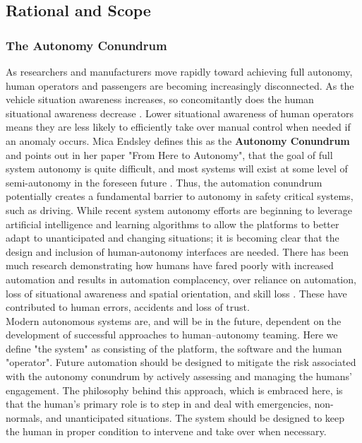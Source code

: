\subsection{Rational and Scope}
\subsubsection{The Autonomy Conundrum}
As researchers and manufacturers move rapidly toward achieving full autonomy, human operators and passengers are becoming increasingly disconnected. As the vehicle situation awareness increases, so concomitantly does the human situational awareness decrease \cite{Flemisch2003}. Lower situational awareness of human operators means they are less likely to efficiently take over manual control when needed if an anomaly occurs. Mica Endsley defines this as the 
\textbf{Autonomy Conundrum} and points out in her paper "From Here to Autonomy", that the goal of full system autonomy is quite difficult, and most systems will exist at some level of semi-autonomy in the foreseen future \cite{Endsley2017}. Thus, the automation conundrum potentially creates a fundamental barrier to autonomy in safety critical systems, such as driving. While recent system autonomy efforts are beginning to leverage artificial intelligence and learning algorithms to allow the platforms to better adapt to unanticipated and changing situations; it is becoming clear that the design and inclusion of human-autonomy interfaces are needed. There has been much research demonstrating how humans have fared poorly with increased automation and results in automation complacency, over reliance on automation, loss of situational awareness and spatial orientation, and skill loss \cite{Schutte2017,Gouraud2018,Parasuraman1993}. These have contributed to human errors, accidents and loss of trust.\\

Modern autonomous systems are, and will be in the future, dependent on the development of successful approaches to human–autonomy teaming. Here we define "the system" as consisting of the platform, the software and the human "operator". Future automation should be designed to mitigate the risk associated with the autonomy conundrum by actively assessing and managing the humans' engagement. The philosophy behind this approach, which is embraced here, is that the human's primary role is to step in and deal with emergencies, non-normals, and unanticipated situations. The system should be designed to keep the human in proper condition to intervene and take over when necessary.

